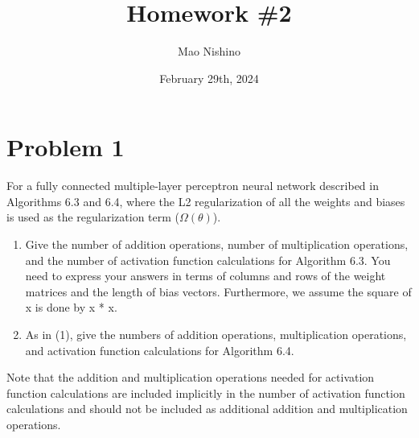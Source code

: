 \documentclass[
	12pt, %
]{../Template/fphw}
\title{Homework \#2} %
\author{Mao Nishino} %
\date{February 29th, 2024} %
\institute{Florida State University \\ Department of Computer Science} %
\begin{document}
\maketitle %


\section*{Problem 1}

\begin{problem}
 For a fully connected multiple-layer perceptron neural network described in Algorithms 6.3 and
6.4, where the L2 regularization of all the weights and biases is used as the regularization term ($\Omega(\theta)$).
\begin{enumerate}[label=(\arabic*)]
    \item Give the number of addition operations, number of multiplication operations, and the number of activation
function calculations for Algorithm 6.3. You need to express your answers in terms of columns and rows of the
weight matrices and the length of bias vectors. Furthermore, we assume the square of x is done by x * x.
    \item As in (1), give the numbers of addition operations, multiplication operations, and activation function calculations for Algorithm 6.4.
\end{enumerate}
Note that the addition and multiplication operations needed for activation function calculations are included implicitly
in the number of activation function calculations and should not be included as additional addition and multiplication
operations.
\end{problem}

\end{document}
